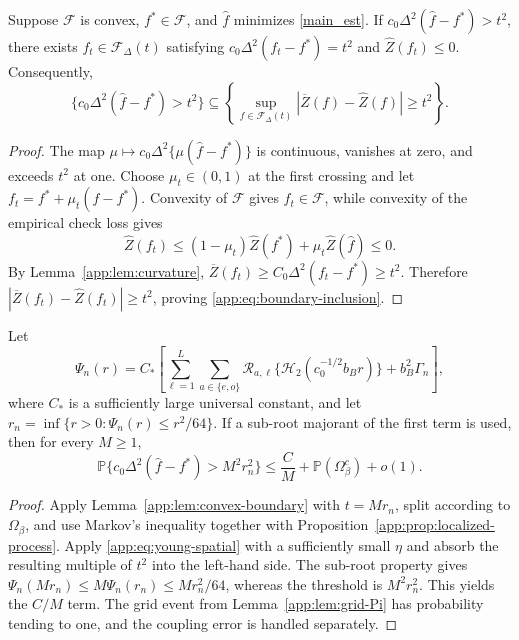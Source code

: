 \documentclass[twoside,11pt]{article}
\newenvironment{revision}{\color{revisionred}}{}
\begin{document}
\begin{revision}
\begin{lemma}
\label{app:lem:convex-boundary}
Suppose $\mathcal F$ is convex, $f^*\in\mathcal F$, and $\widehat f$ minimizes
\eqref{main_est}.  If $c_0\Delta^2(\widehat f-f^*)>t^2$, there exists
$f_t\in\mathcal F_\Delta(t)$ satisfying
$c_0\Delta^2(f_t-f^*)=t^2$ and $\widehat Z(f_t)\le0$.  Consequently,
\begin{equation}
 \{c_0\Delta^2(\widehat f-f^*)>t^2\}
 \subseteq
 \left\{\sup_{f\in\mathcal F_\Delta(t)}
 |\overline Z(f)-\widehat Z(f)|\ge t^2\right\}.                \label{app:eq:boundary-inclusion}
\end{equation}
\end{lemma}

\begin{proof}
The map
$\mu\mapsto c_0\Delta^2\{\mu(\widehat f-f^*)\}$ is continuous, vanishes at
zero, and exceeds $t^2$ at one.  Choose $\mu_t\in(0,1)$ at the first crossing
and let $f_t=f^*+\mu_t(\widehat f-f^*)$.  Convexity of $\mathcal F$ gives
$f_t\in\mathcal F$, while convexity of the empirical check loss gives
\[
 \widehat Z(f_t)\le(1-\mu_t)\widehat Z(f^*)+\mu_t\widehat Z(\widehat f)\le0.
\]
By Lemma~\ref{app:lem:curvature},
$\overline Z(f_t)\ge C_0\Delta^2(f_t-f^*)\ge t^2$.  Therefore
$|\overline Z(f_t)-\widehat Z(f_t)|\ge t^2$, proving
\eqref{app:eq:boundary-inclusion}.
\end{proof}

\begin{lemma}
\label{app:lem:critical-radius}
Let
\begin{equation}
 \Psi_n(r)=C_*\left[
 \sum_{\ell=1}^L\sum_{a\in\{e,o\}}
 \mathcal R_{a,\ell}\{\mathcal H_2(c_0^{-1/2}b_Br)\}
 +b_B^2\Gamma_n\right],                                       \label{app:eq:Psi-star}
\end{equation}
where $C_*$ is a sufficiently large universal constant, and let
$r_n=\inf\{r>0:\Psi_n(r)\le r^2/64\}$.  If a sub-root majorant of the first
term is used, then for every $M\ge1$,
\begin{equation}
 \mathbb P\{c_0\Delta^2(\widehat f-f^*)>M^2r_n^2\}
 \le \frac{C}{M}+\mathbb P(\Omega_\beta^c)+o(1).               \label{app:eq:Op-tail}
\end{equation}
\end{lemma}

\begin{proof}
Apply Lemma~\ref{app:lem:convex-boundary} with $t=Mr_n$, split according to
$\Omega_\beta$, and use Markov's inequality together with
Proposition~\ref{app:prop:localized-process}.  Apply
\eqref{app:eq:young-spatial} with a sufficiently small $\eta$ and absorb the
resulting multiple of $t^2$ into the left-hand side.  The sub-root property
gives
$\Psi_n(Mr_n)\le M\Psi_n(r_n)\le Mr_n^2/64$, whereas the threshold is
$M^2r_n^2$.  This yields the $C/M$ term.  The grid event from
Lemma~\ref{app:lem:grid-Pi} has probability tending to one, and the coupling
error is handled separately.
\end{proof}


\end{revision}
\end{document}
